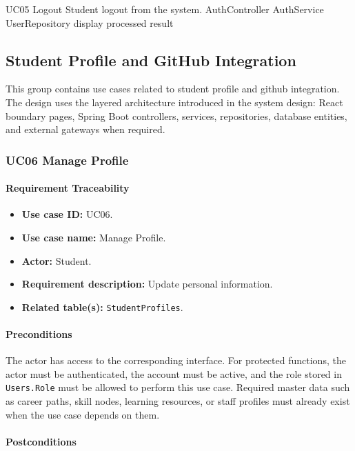 \SequenceDiagram
{UC05 Logout}
{Student}
{logout from the system.}
{AuthController}
{AuthService}
{UserRepository}
{display processed result}

\subsection{Student Profile and GitHub Integration}

This group contains use cases related to student profile and github integration. The design uses the layered architecture introduced in the system design: React boundary pages, Spring Boot controllers, services, repositories, database entities, and external gateways when required.

\subsubsection{UC06 Manage Profile}

\paragraph{Requirement Traceability}

\begin{itemize}
    \item \textbf{Use case ID:} UC06.
    \item \textbf{Use case name:} Manage Profile.
    \item \textbf{Actor:} Student.
    \item \textbf{Requirement description:} Update personal information.
    \item \textbf{Related table(s):} \texttt{StudentProfiles}.
\end{itemize}

\paragraph{Preconditions}

The actor has access to the corresponding interface. For protected functions, the actor must be authenticated, the account must be active, and the role stored in \texttt{Users.Role} must be allowed to perform this use case. Required master data such as career paths, skill nodes, learning resources, or staff profiles must already exist when the use case depends on them.

\paragraph{Postconditions}

